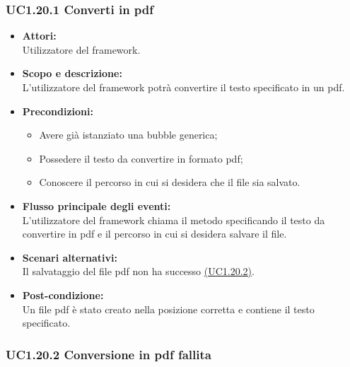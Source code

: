 \subsubsection{UC1.20.1 Converti in pdf} \label{UC1.20.1}

\begin{itemize}
	\item \textbf{Attori:}
	\\Utilizzatore del framework.
	\item \textbf{Scopo e descrizione:} 
	\\L’utilizzatore del framework potrà convertire il testo specificato in un pdf.
	\item \textbf{Precondizioni:}
	\begin{itemize}
		\item Avere già istanziato una bubble generica;
		\item Possedere il testo da convertire in formato pdf;
		\item Conoscere il percorso in cui si desidera che il file sia salvato.
	\end{itemize}
	\item \textbf{Flusso principale degli eventi:}
	\\L’utilizzatore del framework chiama il metodo specificando il testo da convertire in pdf e il percorso in cui si desidera salvare il file.
	\item \textbf{Scenari alternativi:}
	\\Il salvataggio del file pdf non ha successo \hyperref[UC1.20.2]{(UC1.20.2)}.
	\item \textbf{Post-condizione:}
	\\Un file pdf è stato creato nella posizione corretta e contiene il testo specificato.
\end{itemize}

\subsubsection{UC1.20.2 Conversione in pdf fallita} \label{UC1.20.2}

